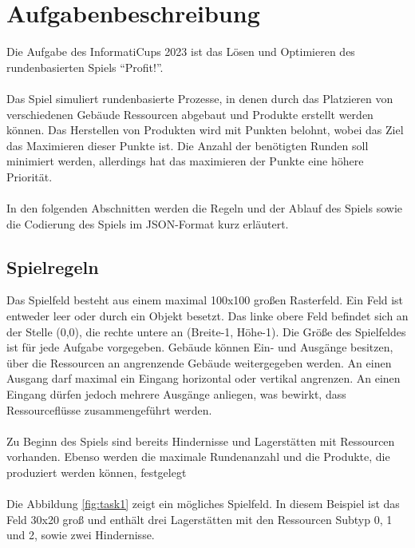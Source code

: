 \section{Aufgabenbeschreibung}\label{cap:aufgabenbeschriebung}
Die Aufgabe des InformatiCups 2023 ist das Lösen und Optimieren des rundenbasierten Spiels “Profit!”. 
\\\\
Das Spiel simuliert rundenbasierte Prozesse, in denen durch das Platzieren von verschiedenen Gebäude Ressourcen abgebaut und Produkte erstellt werden können. Das Herstellen von Produkten wird mit Punkten belohnt, wobei das Ziel das Maximieren dieser Punkte ist. Die Anzahl der benötigten Runden soll minimiert werden, allerdings hat das maximieren der Punkte eine höhere Priorität.
\\\\
In den folgenden Abschnitten werden die Regeln und der Ablauf des Spiels sowie die Codierung des Spiels im JSON-Format kurz erläutert.

\subsection{Spielregeln}\label{cap:spielregeln}
Das Spielfeld besteht aus einem maximal 100x100 großen Rasterfeld. Ein Feld ist entweder leer oder durch ein Objekt besetzt. Das linke obere Feld befindet sich an der Stelle (0,0), die rechte untere an (Breite-1, Höhe-1). Die Größe des Spielfeldes ist für jede Aufgabe vorgegeben. Gebäude können Ein- und Ausgänge besitzen, über die Ressourcen an angrenzende Gebäude weitergegeben werden. An einen Ausgang darf maximal ein Eingang horizontal oder vertikal angrenzen. An einen Eingang dürfen jedoch mehrere Ausgänge anliegen, was bewirkt, dass Ressourceflüsse zusammengeführt werden. 
\\\\
Zu Beginn des Spiels sind bereits Hindernisse und Lagerstätten mit Ressourcen vorhanden.
Ebenso werden die maximale Rundenanzahl und die Produkte, die produziert werden können, festgelegt
\\\\
Die Abbildung \ref{fig:task1} zeigt ein mögliches Spielfeld. In diesem Beispiel ist das Feld 30x20 groß und enthält drei Lagerstätten mit den Ressourcen Subtyp 0, 1 und 2, sowie zwei Hindernisse.

